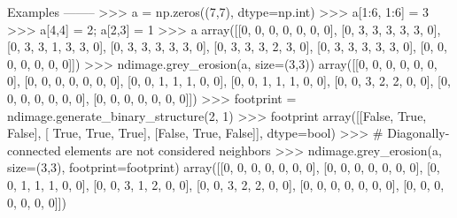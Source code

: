 \begin{DoxyVerb}
Examples
--------
>>> a = np.zeros((7,7), dtype=np.int)
>>> a[1:6, 1:6] = 3
>>> a[4,4] = 2; a[2,3] = 1
>>> a
array([[0, 0, 0, 0, 0, 0, 0],
       [0, 3, 3, 3, 3, 3, 0],
       [0, 3, 3, 1, 3, 3, 0],
       [0, 3, 3, 3, 3, 3, 0],
       [0, 3, 3, 3, 2, 3, 0],
       [0, 3, 3, 3, 3, 3, 0],
       [0, 0, 0, 0, 0, 0, 0]])
>>> ndimage.grey_erosion(a, size=(3,3))
array([[0, 0, 0, 0, 0, 0, 0],
       [0, 0, 0, 0, 0, 0, 0],
       [0, 0, 1, 1, 1, 0, 0],
       [0, 0, 1, 1, 1, 0, 0],
       [0, 0, 3, 2, 2, 0, 0],
       [0, 0, 0, 0, 0, 0, 0],
       [0, 0, 0, 0, 0, 0, 0]])
>>> footprint = ndimage.generate_binary_structure(2, 1)
>>> footprint
array([[False,  True, False],
       [ True,  True,  True],
       [False,  True, False]], dtype=bool)
>>> # Diagonally-connected elements are not considered neighbors
>>> ndimage.grey_erosion(a, size=(3,3), footprint=footprint)
array([[0, 0, 0, 0, 0, 0, 0],
       [0, 0, 0, 0, 0, 0, 0],
       [0, 0, 1, 1, 1, 0, 0],
       [0, 0, 3, 1, 2, 0, 0],
       [0, 0, 3, 2, 2, 0, 0],
       [0, 0, 0, 0, 0, 0, 0],
       [0, 0, 0, 0, 0, 0, 0]])\end{DoxyVerb}
 \hypertarget{namespacescipy_1_1ndimage_1_1morphology_ad2c94356038bb7c8160c0ebbe9961865}{}
